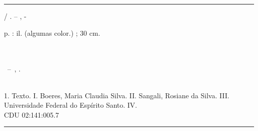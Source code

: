 \documentclass[
	12pt,				%
	openright,			%
	oneside,			%
	a4paper,			%
	english,			%
	french,				%
	spanish,			%
	brazil				%
	]{abntex2}
\begin{document}
%     
\begin{fichacatalografica}
	\vspace*{\fill}
	\hrule
	\begin{center}
	\begin{minipage}[c]{12.5cm}

	\imprimirautor

	\hspace{0.5cm} \imprimirtitulo  / \imprimirautor. --
	\imprimirlocal, \imprimirdata-

	\hspace{0.5cm} \pageref{LastPage} p. : il. (algumas color.) ; 30 cm.\\

	\hspace{0.5cm} \imprimirorientadorRotulo~\imprimirorientador\\

	\hspace{0.5cm} \imprimircoorientadorRotulo~\imprimircoorientador\\

	\hspace{0.5cm}
	\parbox[t]{\textwidth}{\imprimirtipotrabalho~--~\imprimirinstituicao,
	\imprimirdata.}\\

	\hspace{0.5cm}
		1. Texto.
		I. Boeres, Maria Claudia Silva.
		II. Sangali, Rosiane da Silva.
		III. Universidade Federal do Espírito Santo.
		IV. \imprimirtitulo \\

	\hspace{8.75cm} CDU 02:141:005.7\\

	\end{minipage}
	\end{center}
	\hrule
\end{fichacatalografica}
\end{document}
